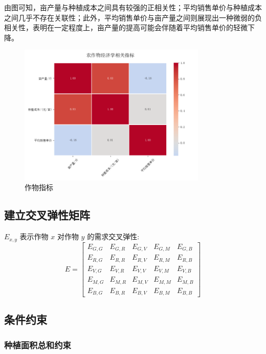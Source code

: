 \documentclass[12pt]{ctexart}
\begin{document}
	
	由图可知，亩产量与种植成本之间具有较强的正相关性；平均销售单价与种植成本之间几乎不存在关联性；此外，平均销售单价与亩产量之间则展现出一种微弱的负相关性，表明在一定程度上，亩产量的提高可能会伴随着平均销售单价的轻微下降。
	\begin{figure}[h]
		\centering
		\includegraphics[width=0.8\textwidth]{image20.png}  %
		\caption{作物指标}
		\label{fig:yield_comparison1}
	\end{figure}
	\subsection{建立交叉弹性矩阵}
$E_{x, y}$ 表示作物 $x$ 对作物 $y$ 的需求交叉弹性:
\begin{equation}
	E = \left[
	\begin{array}{lllll}
		E_{G, G} & E_{G, R} & E_{G, V} & E_{G, M} & E_{G, B} \\
		E_{R, G} & E_{R, R} & E_{R, V} & E_{R, M} & E_{R, B} \\
		E_{V, G} & E_{V, R} & E_{V, V} & E_{V, M} & E_{V, B} \\
		E_{M, G} & E_{M, R} & E_{M, V} & E_{M, M} & E_{M, B} \\
		E_{B, G} & E_{B, R} & E_{B, V} & E_{B, M} & E_{B, B}
	\end{array}
	\right]
\end{equation}
	
	\subsection{条件约束}
	\subsubsection{种植面积总和约束}
	
\end{document}

